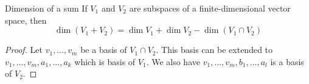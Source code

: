 \documentclass[11pt]{article}
\begin{document}
\begin{theorem}{Dimension of a sum}
  If $V_1$ and $V_2$ are subspaces of a finite-dimensional vector space, then
  \[
    \dim(V_1 + V_2) = \dim V_1 + \dim V_2 - \dim(V_1 \cap V_2)
  \]
\end{theorem}
\begin{proof}
  Let $v_1,\dots,v_m$ be a basis of $V_1 \cap V_2$. This basis can be extended to $v_1,\dots,v_m, a_1 , \dots,a_k$ which is basis of $V_1$. We also have $v_1,\dots,v_m, b_1 , \dots,a_l$ is a basis of $V_2$.
\end{proof}
\end{document}
